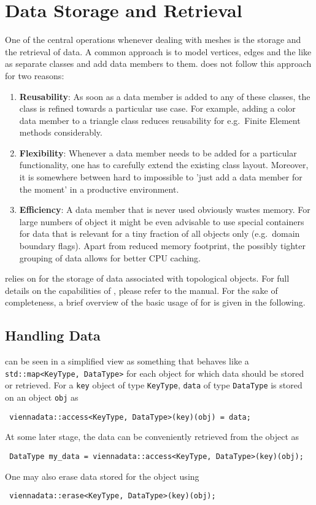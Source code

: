 \chapter{Data Storage and Retrieval} \label{chap:data}
One of the central operations whenever dealing with meshes is the storage and the retrieval of data.
A common approach is to model vertices, edges and the like as separate classes and add data members to them.
{\ViennaGrid} does not follow this approach for two reasons:
\begin{enumerate}
 \item \textbf{Reusability}: As soon as a data member is added to any of these classes, the class is refined towards a particular use case. For example, adding a color data member to a triangle class reduces reusability for e.g.~Finite Element methods considerably.
 \item \textbf{Flexibility}: Whenever a data member needs to be added for a particular functionality, one has to carefully extend the existing class layout. Moreover, it is somewhere between hard to impossible to 'just add a data member for the moment' in a productive environment.
 \item \textbf{Efficiency}: A data member that is never used obviously wastes memory. For large numbers of object it might be even advisable to use special containers for data that is relevant for a tiny fraction of all objects only (e.g.~domain boundary flags). Apart from reduced memory footprint, the possibly tighter grouping of data allows for better CPU caching. 
\end{enumerate}
{\ViennaGrid} relies on {\ViennaData} \cite{ViennaData} for the storage of data associated with topological objects.
For full details on the capabilities of {\ViennaData}, please refer to the {\ViennaData} manual.
For the sake of completeness, a brief overview of the basic usage of {\ViennaData} for {\ViennaGrid} is given in the following.


\section{Handling Data}
{\ViennaData} can be seen in a simplified view as something that behaves like a \lstinline|std::map<KeyType, DataType>| for each object for which data should be stored or retrieved. For a \lstinline|key| object of type \lstinline|KeyType|, \lstinline|data| of type \lstinline|DataType| is stored on an object \lstinline|obj| as
\begin{lstlisting}
 viennadata::access<KeyType, DataType>(key)(obj) = data;
\end{lstlisting}
At some later stage, the data can be conveniently retrieved from the object as
\begin{lstlisting}
 DataType my_data = viennadata::access<KeyType, DataType>(key)(obj);
\end{lstlisting}
One may also erase data stored for the object using
\begin{lstlisting}
 viennadata::erase<KeyType, DataType>(key)(obj);
\end{lstlisting}

